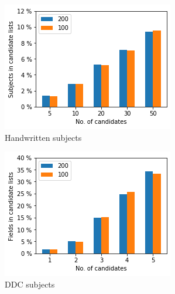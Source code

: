 \begin{figure}
  \begin{subfigure}[t]{.32\textwidth}
    \centering
    \includegraphics[width=\textwidth]{figures/supervised_approach/hidden_hw.png}
    \caption{Handwritten subjects}
    \label{fig:hidden_hw}
  \end{subfigure}
  \begin{subfigure}[t]{.32\textwidth}
    \centering
    \includegraphics[width=\textwidth]{figures/supervised_approach/hidden_ddc.png}
    \caption{DDC subjects}
    \label{fig:hidden_ddc}
  \end{subfigure}
   \begin{subfigure}[t]{.32\textwidth}
    \centering

\end{subfigure}
\end{figure}
